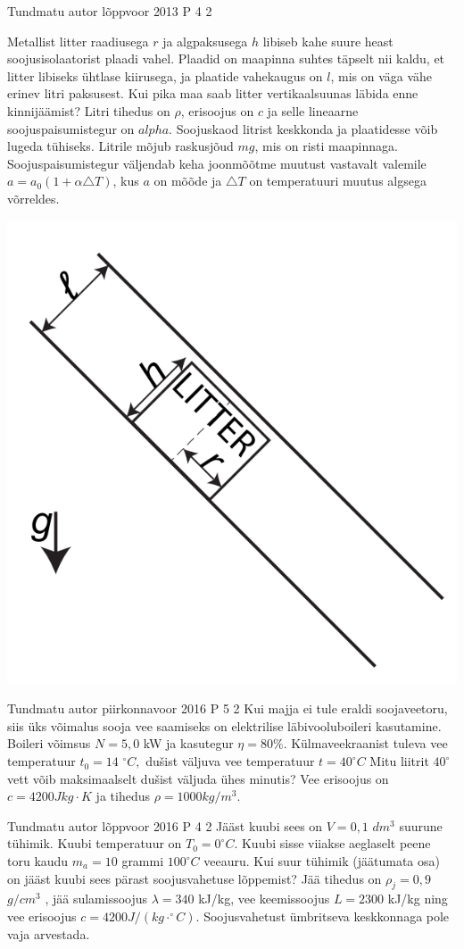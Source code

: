 \documentclass[11pt]{article}
\begin{document}
{%
{Tundmatu autor} %
{lõppvoor} %
{2013} %
{P 4} %
{2} %
{
\ifStatement
Metallist litter raadiusega $r$ ja algpaksusega $h$ libiseb kahe suure heast soojusisolaatorist plaadi vahel. Plaadid on maapinna suhtes täpselt nii kaldu, et litter libiseks ühtlase kiirusega, ja plaatide vahekaugus on $l$, mis on väga vähe erinev litri paksusest. Kui pika maa saab litter vertikaalsuunas läbida enne kinnijäämist? Litri tihedus on $\rho$, erisoojus on $c$ ja selle lineaarne soojuspaisumistegur on $alpha$. Soojuskaod litrist keskkonda ja plaatidesse võib lugeda tühiseks. Litrile mõjub raskusjõud $mg$, mis on risti maapinnaga. Soojuspaisumistegur väljendab keha joonmõõtme muutust vastavalt valemile $a = a_0(1 + \alpha \triangle T)$, kus $a$ on mõõde ja $\triangle T$ on temperatuuri muutus algsega võrreldes. 
\begin{center}
	\includegraphics[width=0.5\linewidth]{2013-v3p-04-yl.PNG}
\end{center}
\fi
}

{Tundmatu autor} %
{piirkonnavoor} %
{2016} %
{P 5} %
{2} %
{
\ifStatement
Kui majja ei tule eraldi soojaveetoru, siis üks võimalus sooja vee saamiseks on elektrilise läbivooluboileri kasutamine. Boileri võimsus $N = 5,0$ kW ja kasutegur $\eta = 80\%$. Külmaveekraanist tuleva vee temperatuur $t_0 = 14$ $^{\circ}C,$ dušist väljuva vee temperatuur $t = 40 ^{\circ}C$ Mitu liitrit $40 ^{\circ}$ vett võib maksimaalselt dušist väljuda ühes minutis? Vee erisoojus on $c = 4200 J kg \cdot K$ ja tihedus $\rho = 1000 kg/m^3$.
\fi
}


{Tundmatu autor} %
{lõppvoor} %
{2016} %
{P 4} %
{2} %
{
\ifStatement
Jääst kuubi sees on $V = 0,1$ $dm^3$ suurune tühimik. Kuubi temperatuur on $T_0 = 0^{\circ}C$. Kuubi sisse viiakse aeglaselt peene toru kaudu $m_a = 10$ grammi $100 ^{\circ}C$ veeauru. Kui suur tühimik (jäätumata osa) on jääst kuubi sees pärast soojusvahetuse lõppemist? Jää tihedus on $\rho_j = 0,9$ $g/cm^3$ , jää sulamissoojus $\lambda = 340$ kJ/kg, vee keemissoojus $L = 2300$ kJ/kg ning vee erisoojus $c = 4200 J/(kg \cdot ^{\circ}C)$. Soojusvahetust ümbritseva keskkonnaga pole vaja arvestada. 
\fi
}

}
\end{document}
